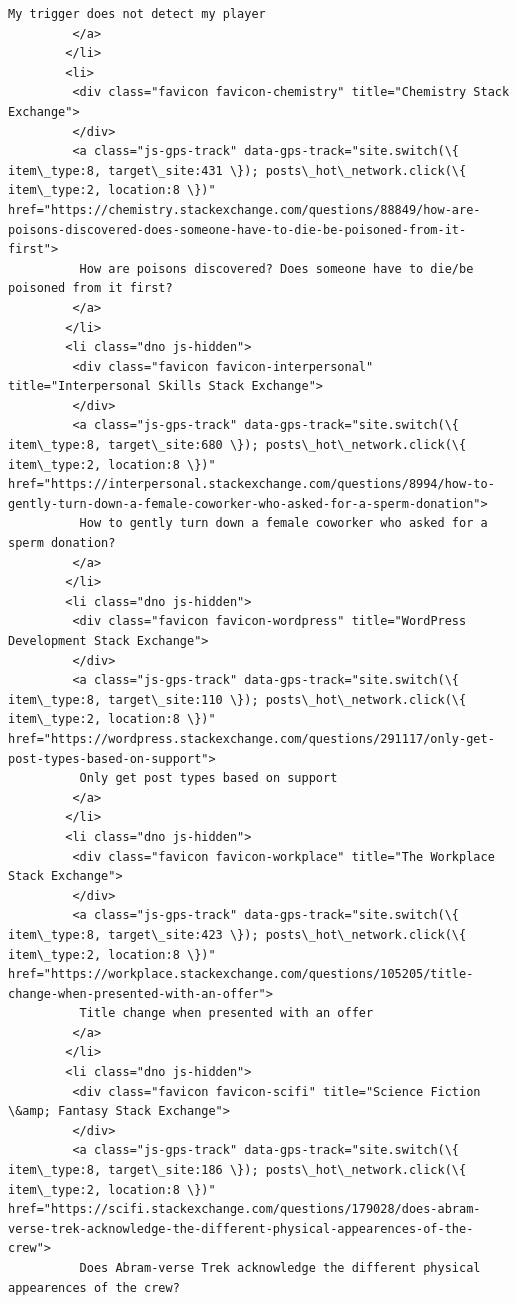 \documentclass[11pt]{article}
\begin{document}
\begin{Verbatim}[commandchars=\\\{\}]
          My trigger does not detect my player
         </a>
        </li>
        <li>
         <div class="favicon favicon-chemistry" title="Chemistry Stack Exchange">
         </div>
         <a class="js-gps-track" data-gps-track="site.switch(\{ item\_type:8, target\_site:431 \}); posts\_hot\_network.click(\{ item\_type:2, location:8 \})" href="https://chemistry.stackexchange.com/questions/88849/how-are-poisons-discovered-does-someone-have-to-die-be-poisoned-from-it-first">
          How are poisons discovered? Does someone have to die/be poisoned from it first?
         </a>
        </li>
        <li class="dno js-hidden">
         <div class="favicon favicon-interpersonal" title="Interpersonal Skills Stack Exchange">
         </div>
         <a class="js-gps-track" data-gps-track="site.switch(\{ item\_type:8, target\_site:680 \}); posts\_hot\_network.click(\{ item\_type:2, location:8 \})" href="https://interpersonal.stackexchange.com/questions/8994/how-to-gently-turn-down-a-female-coworker-who-asked-for-a-sperm-donation">
          How to gently turn down a female coworker who asked for a sperm donation?
         </a>
        </li>
        <li class="dno js-hidden">
         <div class="favicon favicon-wordpress" title="WordPress Development Stack Exchange">
         </div>
         <a class="js-gps-track" data-gps-track="site.switch(\{ item\_type:8, target\_site:110 \}); posts\_hot\_network.click(\{ item\_type:2, location:8 \})" href="https://wordpress.stackexchange.com/questions/291117/only-get-post-types-based-on-support">
          Only get post types based on support
         </a>
        </li>
        <li class="dno js-hidden">
         <div class="favicon favicon-workplace" title="The Workplace Stack Exchange">
         </div>
         <a class="js-gps-track" data-gps-track="site.switch(\{ item\_type:8, target\_site:423 \}); posts\_hot\_network.click(\{ item\_type:2, location:8 \})" href="https://workplace.stackexchange.com/questions/105205/title-change-when-presented-with-an-offer">
          Title change when presented with an offer
         </a>
        </li>
        <li class="dno js-hidden">
         <div class="favicon favicon-scifi" title="Science Fiction \&amp; Fantasy Stack Exchange">
         </div>
         <a class="js-gps-track" data-gps-track="site.switch(\{ item\_type:8, target\_site:186 \}); posts\_hot\_network.click(\{ item\_type:2, location:8 \})" href="https://scifi.stackexchange.com/questions/179028/does-abram-verse-trek-acknowledge-the-different-physical-appearences-of-the-crew">
          Does Abram-verse Trek acknowledge the different physical appearences of the crew?

\end{Verbatim}
\end{document}
